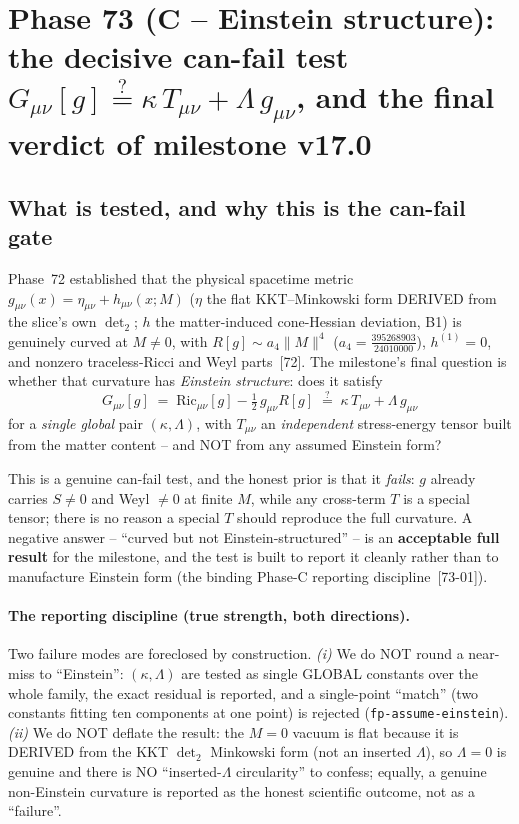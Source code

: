 \section{Phase 73 (C -- Einstein structure): the decisive can-fail test
$G_{\mu\nu}[g]\stackrel{?}{=}\kappa\,T_{\mu\nu}+\Lambda\,g_{\mu\nu}$, and the
final verdict of milestone v17.0}

\subsection{What is tested, and why this is the can-fail gate}

Phase~72 established that the physical spacetime metric $g_{\mu\nu}(x)=\eta_{\mu\nu}
+h_{\mu\nu}(x;M)$ ($\eta$ the flat KKT--Minkowski form DERIVED from the slice's own
$\det_2$; $h$ the matter-induced cone-Hessian deviation, B1) is genuinely curved at
$M\neq0$, with $R[g]\sim a_4\|M\|^4$ ($a_4=\tfrac{395268903}{24010000}$), $h^{(1)}=0$,
and nonzero traceless-Ricci and Weyl parts~[72]. The milestone's final question is
whether that curvature has \emph{Einstein structure}: does it satisfy
\begin{equation}
  G_{\mu\nu}[g] \;=\; \mathrm{Ric}_{\mu\nu}[g] - \tfrac12\,g_{\mu\nu}R[g]
              \;\stackrel{?}{=}\; \kappa\,T_{\mu\nu} + \Lambda\,g_{\mu\nu}
  \label{eq:einstein-test}
\end{equation}
for a \emph{single global} pair $(\kappa,\Lambda)$, with $T_{\mu\nu}$ an
\emph{independent} stress-energy tensor built from the matter content -- and NOT from
any assumed Einstein form?

This is a genuine can-fail test, and the honest prior is that it \emph{fails}: $g$
already carries $S\neq0$ and Weyl $\neq0$ at finite $M$, while any cross-term $T$ is a
special tensor; there is no reason a special $T$ should reproduce the full curvature.
A negative answer -- ``curved but not Einstein-structured'' -- is an \textbf{acceptable
full result} for the milestone, and the test is built to report it cleanly rather than
to manufacture Einstein form (the binding Phase-C reporting discipline~[73-01]).

\paragraph{The reporting discipline (true strength, both directions).}
Two failure modes are foreclosed by construction. \emph{(i)} We do NOT round a near-miss
to ``Einstein'': $(\kappa,\Lambda)$ are tested as single GLOBAL constants over the whole
family, the exact residual is reported, and a single-point ``match'' (two constants
fitting ten components at one point) is rejected (\texttt{fp-assume-einstein}). \emph{(ii)}
We do NOT deflate the result: the $M=0$ vacuum is flat because it is DERIVED from the KKT
$\det_2$ Minkowski form (not an inserted $\Lambda$), so $\Lambda=0$ is genuine and there is
NO ``inserted-$\Lambda$ circularity'' to confess; equally, a genuine non-Einstein curvature
is reported as the honest scientific outcome, not as a ``failure''.

